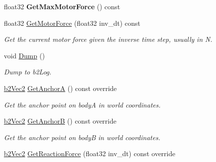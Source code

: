 \begin{DoxyCompactItemize}
\mbox{\label{classb2PrismaticJoint_aea8d0701bdf00a38fd2f24d94ae74842}} 
float32 {\bfseries Get\+Max\+Motor\+Force} () const
\item 
\mbox{\label{classb2PrismaticJoint_aaf7a7fe2300d9fe7a810306e9cfbb41a}} 
float32 \hyperlink{classb2PrismaticJoint_aaf7a7fe2300d9fe7a810306e9cfbb41a}{Get\+Motor\+Force} (float32 inv\+\_\+dt) const
\begin{DoxyCompactList}\small\item\em Get the current motor force given the inverse time step, usually in N. \end{DoxyCompactList}\item 
\mbox{\label{classb2PrismaticJoint_a1d8e01f0c7ca9e1840f1f17c17dda7db}} 
void \hyperlink{classb2PrismaticJoint_a1d8e01f0c7ca9e1840f1f17c17dda7db}{Dump} ()
\begin{DoxyCompactList}\small\item\em Dump to b2\+Log. \end{DoxyCompactList}\item 
\mbox{\label{classb2PrismaticJoint_abb6649d2a18abb209f68d5255cd6c606}} 
\hyperlink{structb2Vec2}{b2\+Vec2} \hyperlink{classb2PrismaticJoint_abb6649d2a18abb209f68d5255cd6c606}{Get\+AnchorA} () const override
\begin{DoxyCompactList}\small\item\em Get the anchor point on bodyA in world coordinates. \end{DoxyCompactList}\item 
\mbox{\label{classb2PrismaticJoint_a7e1d328bfd05895fd228c07bac41b9e5}} 
\hyperlink{structb2Vec2}{b2\+Vec2} \hyperlink{classb2PrismaticJoint_a7e1d328bfd05895fd228c07bac41b9e5}{Get\+AnchorB} () const override
\begin{DoxyCompactList}\small\item\em Get the anchor point on bodyB in world coordinates. \end{DoxyCompactList}\item 
\mbox{\label{classb2PrismaticJoint_ad73abb0ea7e316e863c35f4179ebc7ab}} 
\hyperlink{structb2Vec2}{b2\+Vec2} \hyperlink{classb2PrismaticJoint_ad73abb0ea7e316e863c35f4179ebc7ab}{Get\+Reaction\+Force} (float32 inv\+\_\+dt) const override

\end{DoxyCompactItemize}
